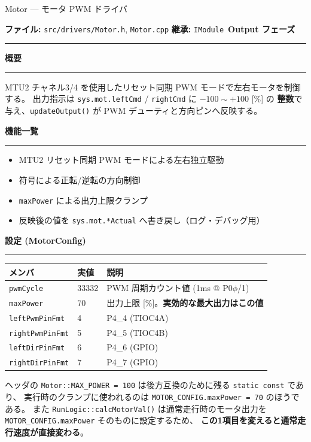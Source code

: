 \documentclass[a4paper,11pt,dvipdfmx]{jsarticle}
\makeatletter
\newcommand{\apisection}[1]{%
  \par\addvspace{4mm}%
  {\normalsize\bfseries\color{headerblue} #1}%
  \par\vspace{-1mm}%
  {\color{accentblue!40}\rule{\linewidth}{0.5pt}}%
  \par\nobreak\vspace{2mm}%
  \@afterheading
}
\newcommand{\phasebadge}[1]{%
  \colorbox{accentblue!10}{\small\bfseries\color{accentblue!80!black}\,#1\,}%
}
\makeatother
\begin{document}
\begin{apibox}{Motor --- モータ PWM ドライバ}

\textbf{ファイル:} \texttt{src/drivers/Motor.h}, \texttt{Motor.cpp} \hfill
\textbf{継承:} \texttt{IModule} \hfill
\phasebadge{Output フェーズ}

\vspace{2mm}\hrule\vspace{2mm}

\apisection{概要}

MTU2 チャネル3/4 を使用したリセット同期 PWM モードで左右モータを制御する。
出力指示は \texttt{sys.mot.leftCmd} / \texttt{rightCmd} に $-100 \sim +100$ [\%] の
\textbf{整数}で与え、\texttt{updateOutput()} が PWM デューティと方向ピンへ反映する。

\apisection{機能一覧}

\begin{itemize}[nosep]
  \item MTU2 リセット同期 PWM モードによる左右独立駆動
  \item 符号による正転/逆転の方向制御
  \item \texttt{maxPower} による出力上限クランプ
  \item 反映後の値を \texttt{sys.mot.*Actual} へ書き戻し（ログ・デバッグ用）
\end{itemize}

\apisection{設定 (MotorConfig)}

\begin{tabularx}{\textwidth}{l l X}
\toprule
\textbf{メンバ} & \textbf{実値} & \textbf{説明} \\
\midrule
\texttt{pwmCycle}       & 33332 & PWM 周期カウント値 (1ms @ P0$\phi$/1) \\
\texttt{maxPower}       & 70    & 出力上限 [\%]。\textbf{実効的な最大出力はこの値} \\
\texttt{leftPwmPinFmt}  & 4     & P4\_4 (TIOC4A) \\
\texttt{rightPwmPinFmt} & 5     & P4\_5 (TIOC4B) \\
\texttt{leftDirPinFmt}  & 6     & P4\_6 (GPIO) \\
\texttt{rightDirPinFmt} & 7     & P4\_7 (GPIO) \\
\bottomrule
\end{tabularx}

\begin{notebox}
ヘッダの \texttt{Motor::MAX\_POWER = 100} は後方互換のために残る \texttt{static const} であり、
実行時のクランプに使われるのは \texttt{MOTOR\_CONFIG.maxPower = 70} のほうである。
また \texttt{RunLogic::calcMotorVal()} は通常走行時のモータ出力を
\texttt{MOTOR\_CONFIG.maxPower} そのものに設定するため、
\textbf{この1項目を変えると通常走行速度が直接変わる}。
\end{notebox}


\end{apibox}
\end{document}
